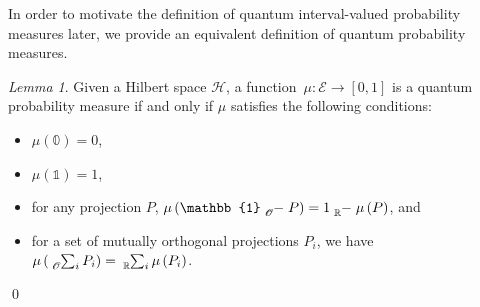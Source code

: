 \documentclass{article}
\theoremstyle{remark}
\newtheorem{lemma}{Lemma}
\newcommand{\events}{\ensuremath{\mathcal{E}}}
\newcommand{\Hilb}{\mathcal{H}}
\begin{document}
In order to motivate the definition of quantum interval-valued probability
measures later, we provide an equivalent definition of quantum probability
measures.

\begin{lemma}\label{lem:quantumProbabilityMeasure}Given a Hilbert
space $\Hilb$, a function~$\mu:\events\rightarrow[0,1]$ is a quantum probability
measure if and only if $\mu$ satisfies the following conditions:
\begin{itemize}
\item $\mu(\mathbb{0})=0$, 
\item $\mu(\mathbb{1})=1$, 
\item for any projection $P$,
$\mu\left(\mathbb{1}\tensor*[_{\mathscr{O}}]{-}{}P\right)=1\tensor*[_{\mathbb{R}}]{-}{}\mu\left(P\right)$, and 
\item for a set of mutually orthogonal projections $P_{i}$, we have
$\mu\left(\tensor*[_{\mathscr{O}}]{\sum}{_{i}}P_{i}\right)=\tensor*[_{\mathbb{R}}]{\sum}{_{i}}\mu\left(P_{i}\right)$.
\end{itemize}
\qed\end{lemma}
\end{document}
